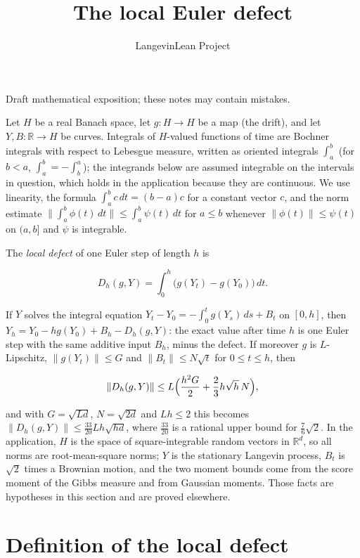 \documentclass[11pt,a4paper]{article}
\title{\texorpdfstring{The local Euler defect}{The local Euler defect}}
\author{LangevinLean Project}
\date{}
\begin{document}
\maketitle
Draft mathematical exposition; these notes may contain mistakes.


Let \(H\) be a real Banach space, let \(g:H\to H\) be a map (the drift), and let \(Y,B:\mathbb R\to H\) be curves. Integrals of \(H\)-valued functions of time are Bochner integrals with respect to Lebesgue measure, written as oriented integrals \(\int_a^b\) (for \(b<a\), \(\int_a^b=-\int_b^a\)); the integrands below are assumed integrable on the intervals in question, which holds in the application because they are continuous. We use linearity, the formula \(\int_a^bc\,dt=(b-a)c\) for a constant vector \(c\), and the norm estimate \(\|\int_a^b\phi(t)\,dt\|\le\int_a^b\psi(t)\,dt\) for \(a\le b\) whenever \(\|\phi(t)\|\le\psi(t)\) on \((a,b]\) and \(\psi\) is integrable.




The \emph{local defect} of one Euler step of length \(h\) is


\[D_h(g,Y)=\int_0^h\bigl(g(Y_t)-g(Y_0)\bigr)\,dt.\]


If \(Y\) solves the integral equation \(Y_t-Y_0=-\int_0^tg(Y_s)\,ds+B_t\) on \([0,h]\), then \(Y_h=Y_0-hg(Y_0)+B_h-D_h(g,Y)\): the exact value after time \(h\) is one Euler step with the same additive input \(B_h\), minus the defect. If moreover \(g\) is \(L\)-Lipschitz, \(\|g(Y_t)\|\le G\) and \(\|B_t\|\le N\sqrt t\) for \(0\le t\le h\), then


\[\|D_h(g,Y)\|\le L\Bigl(\frac{h^2G}2+\frac23h\sqrt h\,N\Bigr),\]


and with \(G=\sqrt{Ld}\), \(N=\sqrt{2d}\) and \(Lh\le2\) this becomes \(\|D_h(g,Y)\|\le\frac{33}{20}Lh\sqrt{hd}\), where \(\frac{33}{20}\) is a rational upper bound for \(\frac76\sqrt2\). In the application, \(H\) is the space of square-integrable random vectors in \(\mathbb R^d\), so all norms are root-mean-square norms; \(Y\) is the stationary Langevin process, \(B_t\) is \(\sqrt2\) times a Brownian motion, and the two moment bounds come from the score moment of the Gibbs measure and from Gaussian moments. Those facts are hypotheses in this section and are proved elsewhere.


\section{\texorpdfstring{Definition of the local defect}{Definition of the local defect}}
\end{document}
